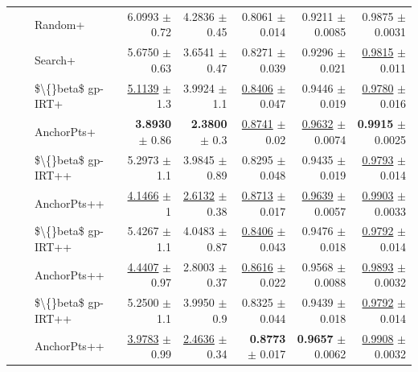 \begin{longtable}{llp{}rrrrr}
 &  & Random+ & 6.0993 {\scriptsize $\pm$ 0.72} & 4.2836 {\scriptsize $\pm$ 0.45} & 0.8061 {\scriptsize $\pm$ 0.014} & 0.9211 {\scriptsize $\pm$ 0.0085} & 0.9875 {\scriptsize $\pm$ 0.0031} \\
 &  & Search+ & 5.6750 {\scriptsize $\pm$ 0.63} & 3.6541 {\scriptsize $\pm$ 0.47} & 0.8271 {\scriptsize $\pm$ 0.039} & 0.9296 {\scriptsize $\pm$ 0.021} & \underline{0.9815} {\scriptsize $\pm$ 0.011} \\
 &  & \$\textbackslash\{\}beta\$ gp-IRT+ & \underline{5.1139} {\scriptsize $\pm$ 1.3} & 3.9924 {\scriptsize $\pm$ 1.1} & \underline{0.8406} {\scriptsize $\pm$ 0.047} & 0.9446 {\scriptsize $\pm$ 0.019} & \underline{0.9780} {\scriptsize $\pm$ 0.016} \\
 &  & AnchorPts+ & \textbf{3.8930} {\scriptsize $\pm$ 0.86} & \textbf{2.3800} {\scriptsize $\pm$ 0.3} & \underline{0.8741} {\scriptsize $\pm$ 0.02} & \underline{0.9632} {\scriptsize $\pm$ 0.0074} & \textbf{0.9915} {\scriptsize $\pm$ 0.0025} \\
 &  & \$\textbackslash\{\}beta\$ gp-IRT++ & 5.2973 {\scriptsize $\pm$ 1.1} & 3.9845 {\scriptsize $\pm$ 0.89} & 0.8295 {\scriptsize $\pm$ 0.048} & 0.9435 {\scriptsize $\pm$ 0.019} & \underline{0.9793} {\scriptsize $\pm$ 0.014} \\
 &  & AnchorPts++ & \underline{4.1466} {\scriptsize $\pm$ 1} & \underline{2.6132} {\scriptsize $\pm$ 0.38} & \underline{0.8713} {\scriptsize $\pm$ 0.017} & \underline{0.9639} {\scriptsize $\pm$ 0.0057} & \underline{0.9903} {\scriptsize $\pm$ 0.0033} \\
 &  & \$\textbackslash\{\}beta\$ gp-IRT++ & 5.4267 {\scriptsize $\pm$ 1.1} & 4.0483 {\scriptsize $\pm$ 0.87} & \underline{0.8406} {\scriptsize $\pm$ 0.043} & 0.9476 {\scriptsize $\pm$ 0.018} & \underline{0.9792} {\scriptsize $\pm$ 0.014} \\
 &  & AnchorPts++ & \underline{4.4407} {\scriptsize $\pm$ 0.97} & 2.8003 {\scriptsize $\pm$ 0.37} & \underline{0.8616} {\scriptsize $\pm$ 0.022} & 0.9568 {\scriptsize $\pm$ 0.0088} & \underline{0.9893} {\scriptsize $\pm$ 0.0032} \\
 &  & \$\textbackslash\{\}beta\$ gp-IRT++ & 5.2500 {\scriptsize $\pm$ 1.1} & 3.9950 {\scriptsize $\pm$ 0.9} & 0.8325 {\scriptsize $\pm$ 0.044} & 0.9439 {\scriptsize $\pm$ 0.018} & \underline{0.9792} {\scriptsize $\pm$ 0.014} \\
 &  & AnchorPts++ & \underline{3.9783} {\scriptsize $\pm$ 0.99} & \underline{2.4636} {\scriptsize $\pm$ 0.34} & \textbf{0.8773} {\scriptsize $\pm$ 0.017} & \textbf{0.9657} {\scriptsize $\pm$ 0.0062} & \underline{0.9908} {\scriptsize $\pm$ 0.0032} \\

\end{longtable}
